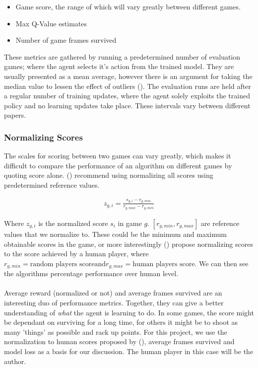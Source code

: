 \begin{itemize}
    \item Game score, the range of which will vary greatly between different games.
    \item Max Q-Value estimates
    \item Number of game frames survived
\end{itemize}

These metrics are gathered by running a predetermined number of evaluation games; where the agent selects it's action from the trained model. They are usually presented as a mean average, however there is an argument for taking the median value to lessen the effect of outliers (\cite{ale-eval-plat}). The evaluation runs are held after a regular number of training updates, where the agent solely exploits the trained policy and no learning updates take place. These intervals vary between different papers.

\subsubsection{Normalizing Scores}
The scales for scoring between two games can vary greatly, which makes it difficult to compare the performance of an algorithm on different games by quoting score alone. (\cite{ale-eval-plat}) recommend using normalizing all scores using predetermined reference values.

\begin{align}
    z_{g, i} = \frac{s_{g, i} - r_{g, min}}{r_{g, max} - r_{g, min}}
\end{align}

Where $z_{g, i}$ is the normalized score $s_i$ in game $g$. $[r_{g, min}, r_{g, max}]$ are reference values that we normalize to. These could be the minimum and maximum obtainable scores in the game, or more interestingly (\cite{human}) propose normalizing scores to the score achieved by a human player, where $r_{g, min} = \text{random players score} \text{and} r_{g, max} = \text{human players score}$. We can then see the algorithms percentage performance over human level. \paragraph{}

Average reward (normalized or not) and average frames survived are an interesting duo of performance metrics. Together, they can give a better understanding of \textit{what} the agent is learning to do. In some games, the score might be dependant on surviving for a long time, for others it might be to shoot as many 'things' as possible and rack up points. For this project, we use the normalization to human scores proposed by (\cite{human}), average frames survived and model loss as a basis for our discussion. The human player in this case will be the author.
